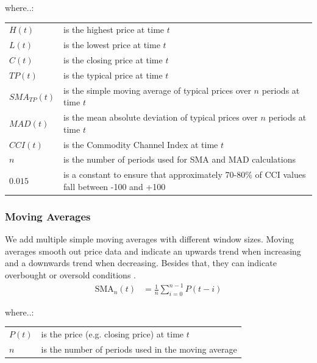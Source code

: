 \documentclass[a4paper,12pt]{report}
\begin{document}
\begin{minipage}{\textwidth}

where..:\\

\begin{tabularx}{\textwidth}{@{}l@{\hspace{2em}--\hspace{2em}}X@{}}
  $H(t)$         & is the highest price at time $t$ \\
  $L(t)$         & is the lowest price at time $t$ \\
  $C(t)$         & is the closing price at time $t$ \\
  $TP(t)$        & is the typical price at time $t$ \\
  $SMA_{TP}(t)$  & is the simple moving average of typical prices over $n$ periods at time $t$ \\
  $MAD(t)$       & is the mean absolute deviation of typical prices over $n$ periods at time $t$ \\
  $CCI(t)$       & is the Commodity Channel Index at time $t$ \\
  $n$            & is the number of periods used for SMA and MAD calculations \\
  $0.015$        & is a constant to ensure that approximately 70-80\% of CCI values fall between -100 and +100 \\
\end{tabularx}

\end{minipage}

			\subsubsection{Moving Averages}
			We add multiple simple moving averages with different window sizes. Moving averages smooth out price data and indicate an upwards trend when increasing and a downwards trend when decreasing. Besides that, they can indicate overbought or oversold conditions \cite{27}. \\
			
			
\begin{equation}
\begin{aligned}
  \text{SMA}_n(t) &= \frac{1}{n} \sum_{i=0}^{n-1} P(t - i)
\end{aligned}
\end{equation}

\begin{minipage}{\textwidth}

where..:\\

\begin{tabularx}{\textwidth}{@{}l@{\hspace{2em}--\hspace{2em}}X@{}}
  $P(t)$ & is the price (e.g. closing price) at time $t$ \\
  $n$    & is the number of periods used in the moving average \\
\end{tabularx}
\end{minipage}
\end{document}
